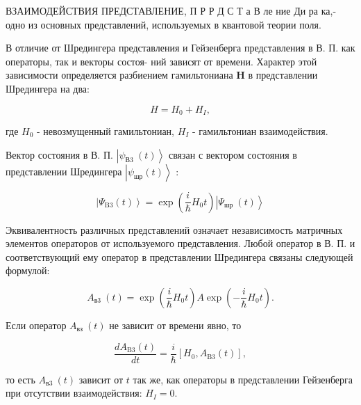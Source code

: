 \documentclass[10pt]{article}
\begin{document}
ВЗАИМОДЕЙСТВИЯ ПРЕДСТАВЛЕНИЕ, П Р Р Д С Т а В ле ние Ди ра ка,- одно из основных представлений, используемых в квантовой теории поля.



В отличие от Шредингера представления и Гейзенберга представления в В. П. как операторы, так и векторы состоя- ний зависят от времени. Характер этой зависимости определяется разбиением гамильтониана $\boldsymbol{H}$ в представлении Шредингера на два:



\[

H=H_{0}+H_{I},

\]



где $H_{0}$ - невозмущенный гамильтониан, $H_{I}$ - гамильтониан взаимодействия.



Вектор состояния в В. П. $\left|\psi_{\text {В3 }}(t)\right\rangle$ связан с вектором состояния в представлении Шредингера $\left|\psi_{ш р}(t)\right\rangle$ :



\[

\left|\Psi_{\mathrm{B3}}(t)\right\rangle=\exp \left(\frac{i}{\hbar} H_{0} t\right)\left|\Psi_{\text {шр }}(t)\right\rangle

\]



Эквивалентность различных представлений означает независимость матричных элементов операторов от используемого представления. Любой оператор в В. П. и соответствующий ему оператор в представлении Шредингера связаны следующей формулой:



\[

A_{\text {в3 }}(t)=\exp \left(\frac{i}{\hbar} H_{0} t\right) A \exp \left(-\frac{i}{\hbar} H_{0} t\right) .

\]



Если оператор $A_{\text {вз }}(t)$ не зависит от времени явно, то



\[

\frac{d A_{\mathrm{B} 3}(t)}{d t}=\frac{i}{\hbar}\left[H_{0}, A_{\mathrm{B} 3}(t)\right],

\]



то есть $A_{\text {в3 }}(t)$ зависит от $t$ так же, как операторы в представлении Гейзенберга при отсутствии взаимодействия: $H_{I}=0$.
\end{document}
